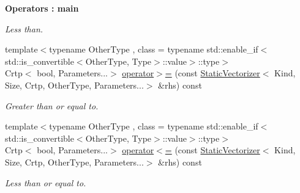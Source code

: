 \begin{Indent}{\bf Operators \-: main}
\begin{DoxyCompactItemize}
\begin{DoxyCompactList}\small\item\em Less than. \end{DoxyCompactList}\item 
{\footnotesize template$<$typename Other\-Type , class  = typename std\-::enable\-\_\-if$<$std\-::is\-\_\-convertible$<$\-Other\-Type, Type$>$\-::value$>$\-::type$>$ }\\Crtp$<$ bool, Parameters...$>$ \hyperlink{classmagrathea_1_1StaticVectorizer_a192cbe3a1821bbff180dfe1422a0ecae}{operator$>$=} (const \hyperlink{classmagrathea_1_1StaticVectorizer}{Static\-Vectorizer}$<$ Kind, Size, Crtp, Other\-Type, Parameters...$>$ \&rhs) const 
\begin{DoxyCompactList}\small\item\em Greater than or equal to. \end{DoxyCompactList}\item 
{\footnotesize template$<$typename Other\-Type , class  = typename std\-::enable\-\_\-if$<$std\-::is\-\_\-convertible$<$\-Other\-Type, Type$>$\-::value$>$\-::type$>$ }\\Crtp$<$ bool, Parameters...$>$ \hyperlink{classmagrathea_1_1StaticVectorizer_a76839b1c705d389cfacfc9ae8d1b8887}{operator$<$=} (const \hyperlink{classmagrathea_1_1StaticVectorizer}{Static\-Vectorizer}$<$ Kind, Size, Crtp, Other\-Type, Parameters...$>$ \&rhs) const 
\begin{DoxyCompactList}\small\item\em Less than or equal to. \end{DoxyCompactList}\end{DoxyCompactItemize}
\end{Indent}

